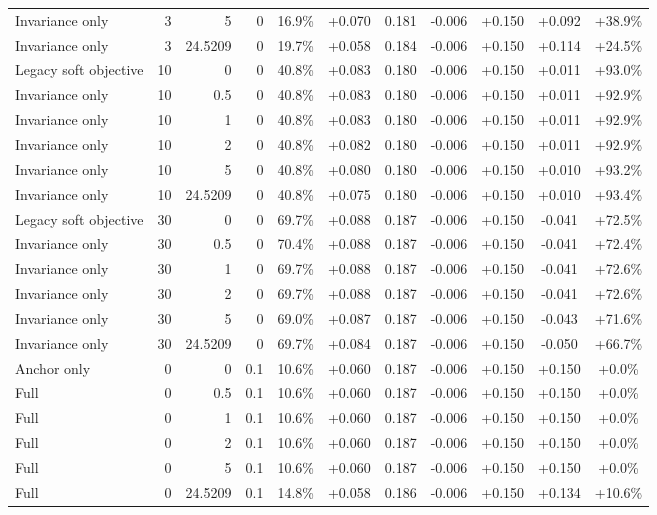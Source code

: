 \begin{table}[htbp]
\begin{tabular}{lrrrccccccc}
Invariance only & 3 & 5 & 0 & 16.9\% & +0.070 & 0.181 & -0.006 & +0.150 & +0.092 & +38.9\% \\
Invariance only & 3 & 24.5209 & 0 & 19.7\% & +0.058 & 0.184 & -0.006 & +0.150 & +0.114 & +24.5\% \\
Legacy soft objective & 10 & 0 & 0 & 40.8\% & +0.083 & 0.180 & -0.006 & +0.150 & +0.011 & +93.0\% \\
Invariance only & 10 & 0.5 & 0 & 40.8\% & +0.083 & 0.180 & -0.006 & +0.150 & +0.011 & +92.9\% \\
Invariance only & 10 & 1 & 0 & 40.8\% & +0.083 & 0.180 & -0.006 & +0.150 & +0.011 & +92.9\% \\
Invariance only & 10 & 2 & 0 & 40.8\% & +0.082 & 0.180 & -0.006 & +0.150 & +0.011 & +92.9\% \\
Invariance only & 10 & 5 & 0 & 40.8\% & +0.080 & 0.180 & -0.006 & +0.150 & +0.010 & +93.2\% \\
Invariance only & 10 & 24.5209 & 0 & 40.8\% & +0.075 & 0.180 & -0.006 & +0.150 & +0.010 & +93.4\% \\
Legacy soft objective & 30 & 0 & 0 & 69.7\% & +0.088 & 0.187 & -0.006 & +0.150 & -0.041 & +72.5\% \\
Invariance only & 30 & 0.5 & 0 & 70.4\% & +0.088 & 0.187 & -0.006 & +0.150 & -0.041 & +72.4\% \\
Invariance only & 30 & 1 & 0 & 69.7\% & +0.088 & 0.187 & -0.006 & +0.150 & -0.041 & +72.6\% \\
Invariance only & 30 & 2 & 0 & 69.7\% & +0.088 & 0.187 & -0.006 & +0.150 & -0.041 & +72.6\% \\
Invariance only & 30 & 5 & 0 & 69.0\% & +0.087 & 0.187 & -0.006 & +0.150 & -0.043 & +71.6\% \\
Invariance only & 30 & 24.5209 & 0 & 69.7\% & +0.084 & 0.187 & -0.006 & +0.150 & -0.050 & +66.7\% \\
Anchor only & 0 & 0 & 0.1 & 10.6\% & +0.060 & 0.187 & -0.006 & +0.150 & +0.150 & +0.0\% \\
Full & 0 & 0.5 & 0.1 & 10.6\% & +0.060 & 0.187 & -0.006 & +0.150 & +0.150 & +0.0\% \\
Full & 0 & 1 & 0.1 & 10.6\% & +0.060 & 0.187 & -0.006 & +0.150 & +0.150 & +0.0\% \\
Full & 0 & 2 & 0.1 & 10.6\% & +0.060 & 0.187 & -0.006 & +0.150 & +0.150 & +0.0\% \\
Full & 0 & 5 & 0.1 & 10.6\% & +0.060 & 0.187 & -0.006 & +0.150 & +0.150 & +0.0\% \\
Full & 0 & 24.5209 & 0.1 & 14.8\% & +0.058 & 0.186 & -0.006 & +0.150 & +0.134 & +10.6\% \\

\end{tabular}
\end{table}
